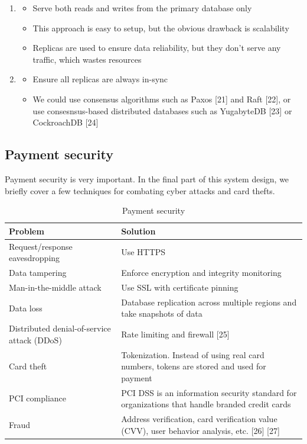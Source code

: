 \documentclass{report}
\theoremstyle{definition}
\let\oldsubsection\subsection
\renewcommand{\subsection}{\oldsubsection*}
\begin{document}
\begin{enumerate}
\item

\begin{itemize}
\item
Serve both reads and writes from the primary database only
\item
This approach is easy to setup, but the obvious drawback is scalability
\item
Replicas are used to ensure data reliability, but they don't serve any traffic, which wastes resources
\end{itemize}

\item
\begin{itemize}
\item
Ensure all replicas are always in-sync
\item
We could use consensus algorithms such as Paxos [21] and Raft [22], or use consesnsus-based distributed databases such as YugabyteDB [23] or CockroachDB [24]
\end{itemize}
\end{enumerate}

\subsection{Payment security}

Payment security is very important. In the final part of this system design, we briefly cover a few techniques for combating cyber attacks and card thefts.

\begin{table}[htbp]
\centering
\renewcommand{\arraystretch}{1.3}
\begin{tabularx}{\textwidth}{|p{}|X|}
\hline
\textbf{Problem} & \textbf{Solution} \\
\hline
Request/response eavesdropping & Use HTTPS \\
\hline
Data tampering & Enforce encryption and integrity monitoring \\
\hline
Man-in-the-middle attack & Use SSL with certificate pinning \\
\hline
Data loss & Database replication across multiple regions and take snapshots of data \\
\hline
Distributed denial-of-service attack (DDoS) & Rate limiting and firewall [25] \\
\hline
Card theft & Tokenization. Instead of using real card numbers, tokens are stored and used for payment \\
\hline
PCI compliance & PCI DSS is an information security standard for organizations that handle branded credit cards \\
\hline
Fraud & Address verification, card verification value (CVV), user behavior analysis, etc. [26] [27] \\
\hline
\end{tabularx}
\caption{Payment security}
\label{tab:payment-security}
\end{table}
\end{document}
